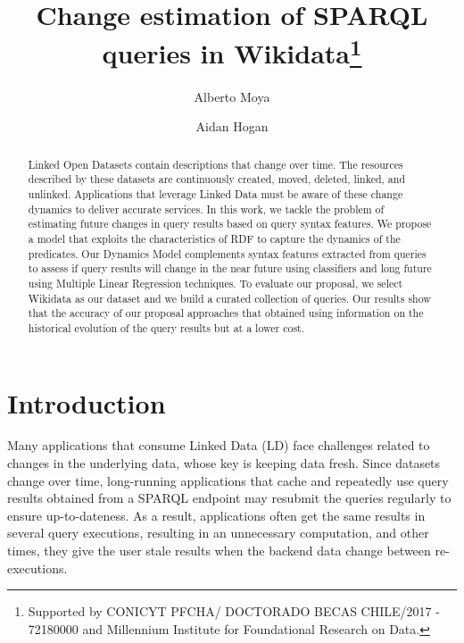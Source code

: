 \documentclass[runningheads]{llncs}
\begin{document}
%
\title{Change estimation of SPARQL queries in Wikidata\thanks{Supported by CONICYT PFCHA/ DOCTORADO BECAS CHILE/2017 - 72180000 and Millennium Institute for Foundational Research on Data.}}
%
%
\author{Alberto Moya \and
Aidan Hogan}%
%
%
%
\maketitle              %
%
\begin{abstract}
Linked Open Datasets contain descriptions that change over time. The resources described by these datasets are continuously created, moved, deleted, linked, and unlinked. Applications that leverage Linked Data must be aware of these change dynamics to deliver accurate services. In this work, we tackle the problem of estimating future changes in query results based on query syntax features. We propose a model that exploits the characteristics of RDF to capture the dynamics of the predicates. Our Dynamics Model complements syntax features extracted from queries to assess if query results will change in the near future using classifiers and long future using Multiple Linear Regression techniques. To evaluate our proposal, we select Wikidata as our dataset and we build a curated collection of queries. Our results show that the accuracy of our proposal approaches that obtained using information on the historical evolution of the query results but at a lower cost.

\end{abstract}
%
%
\section{Introduction}
\label{sec:intro}
%
Many applications that consume Linked Data (LD) face challenges related to changes in the underlying data, whose key is keeping data fresh. Since datasets change over time, long-running applications that cache and repeatedly use query results obtained from a SPARQL endpoint may resubmit the queries regularly to ensure up-to-dateness. As a result, applications often get the same results in several query executions, resulting in an unnecessary computation, and other times, they give the user stale results when the backend data change between re-executions. 
\end{document}
